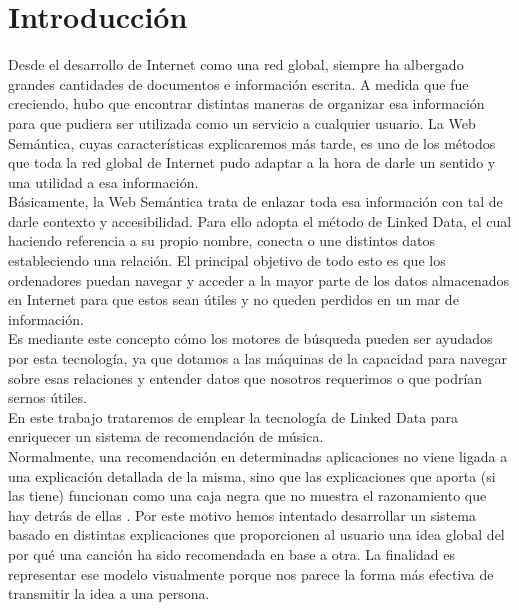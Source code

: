 \chapter{Introducción}
\label{cap:introduccion}

Desde el desarrollo de Internet como una red global, siempre ha albergado grandes cantidades de documentos e información escrita. A medida que fue creciendo, hubo que encontrar distintas maneras de organizar esa información para que pudiera ser utilizada como un servicio a cualquier usuario. La Web Semántica, cuyas características explicaremos más tarde, es uno de los métodos que toda la red global de Internet pudo adaptar a la hora de darle un sentido y una utilidad a esa información.\\

Básicamente, la Web Semántica trata de enlazar toda esa información con tal de darle contexto y accesibilidad. Para ello adopta el método de Linked Data, el cual haciendo referencia a su propio nombre, conecta o une distintos datos estableciendo una relación. El principal objetivo de todo esto es que los ordenadores puedan navegar y acceder a la mayor parte de los datos almacenados en Internet para que estos sean útiles y no queden perdidos en un mar de información.\\

Es mediante este concepto cómo los motores de búsqueda pueden ser ayudados por esta tecnología, ya que dotamos a las máquinas de la capacidad para navegar sobre esas relaciones y entender datos que nosotros requerimos o que podrían sernos útiles.\\

En este trabajo trataremos de emplear la tecnología de Linked Data para enriquecer un sistema de recomendación de música.\\

Normalmente, una recomendación en determinadas aplicaciones no viene ligada a una explicación detallada de la misma, sino que las explicaciones que aporta (si las tiene) funcionan como una caja negra que no muestra el razonamiento que hay detrás de ellas \cite{tintarev2011}. Por este motivo hemos intentado desarrollar un sistema basado en distintas explicaciones que proporcionen al usuario una idea global del por qué una canción ha sido recomendada en base a otra. La finalidad es representar ese modelo visualmente porque nos parece la forma más efectiva de transmitir la idea a una persona.\\

\clearpage

